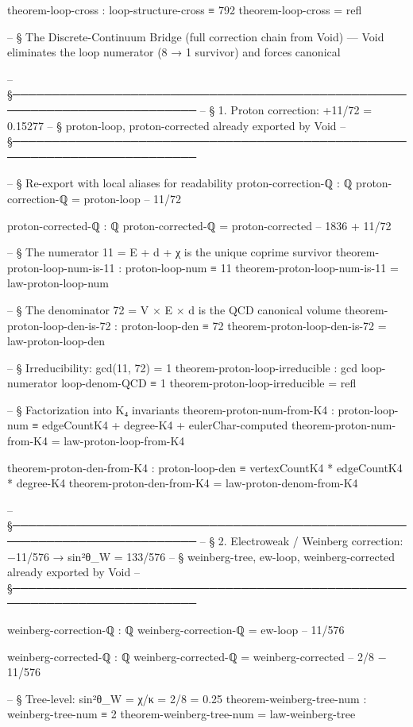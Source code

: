 \documentclass[11pt,a4paper]{book}
\begin{document}
\begin{code}
theorem-loop-cross : loop-structure-cross ≡ 792
theorem-loop-cross = refl

-- § The Discrete-Continuum Bridge (full correction chain from Void) — Void eliminates the loop numerator (8 → 1 survivor) and forces canonical

-- §──────────────────────────────────────────────────────────────────────────
-- § 1. Proton correction: +11/72 = 0.15277̄
-- §    proton-loop, proton-corrected already exported by Void
-- §──────────────────────────────────────────────────────────────────────────

-- § Re-export with local aliases for readability
proton-correction-ℚ : ℚ
proton-correction-ℚ = proton-loop          -- 11/72

proton-corrected-ℚ : ℚ
proton-corrected-ℚ = proton-corrected      -- 1836 + 11/72

-- § The numerator 11 = E + d + χ is the unique coprime survivor
theorem-proton-loop-num-is-11 : proton-loop-num ≡ 11
theorem-proton-loop-num-is-11 = law-proton-loop-num

-- § The denominator 72 = V × E × d is the QCD canonical volume
theorem-proton-loop-den-is-72 : proton-loop-den ≡ 72
theorem-proton-loop-den-is-72 = law-proton-loop-den

-- § Irreducibility: gcd(11, 72) = 1
theorem-proton-loop-irreducible : gcd loop-numerator loop-denom-QCD ≡ 1
theorem-proton-loop-irreducible = refl

-- § Factorization into K₄ invariants
theorem-proton-num-from-K4 : proton-loop-num ≡ edgeCountK4 + degree-K4 + eulerChar-computed
theorem-proton-num-from-K4 = law-proton-loop-from-K4

theorem-proton-den-from-K4 : proton-loop-den ≡ vertexCountK4 * edgeCountK4 * degree-K4
theorem-proton-den-from-K4 = law-proton-denom-from-K4

-- §──────────────────────────────────────────────────────────────────────────
-- § 2. Electroweak / Weinberg correction: −11/576 → sin²θ_W = 133/576
-- §    weinberg-tree, ew-loop, weinberg-corrected already exported by Void
-- §──────────────────────────────────────────────────────────────────────────

weinberg-correction-ℚ : ℚ
weinberg-correction-ℚ = ew-loop            -- 11/576

weinberg-corrected-ℚ : ℚ
weinberg-corrected-ℚ = weinberg-corrected  -- 2/8 − 11/576

-- § Tree-level: sin²θ_W = χ/κ = 2/8 = 0.25
theorem-weinberg-tree-num : weinberg-tree-num ≡ 2
theorem-weinberg-tree-num = law-weinberg-tree


\end{code}
\end{document}
